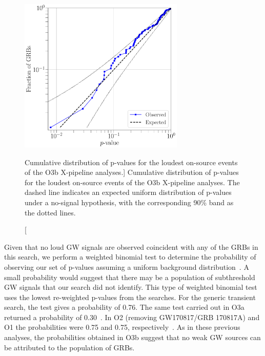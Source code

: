 \begin{figure}[h]
  \centering
  \includegraphics[width=0.7\textwidth]{figures/grb/o3b-x-pval.pdf}
  \caption
  [Cumulative distribution of p-values for the loudest on-source events of the O3b X-pipeline analyses.]
  {
    Cumulative distribution of p-values for the loudest on-source events of the O3b X-pipeline analyses.
    The dashed line indicates an expected uniform distribution of p-values under a no-signal hypothesis, with the corresponding 90\% band as the dotted lines.}
  \label{fig:grb-o3b-x-pval}
\end{figure}

Given that no loud \ac{GW} signals are observed coincident with any of the \acp{GRB} in this search, we perform a weighted binomial test to determine the probability of observing our set of p-values assuming a uniform background distribution~\citep{grb_s4, grb_s6}.
A small probability would suggest that there may be a population of subthreshold \ac{GW} signals that our search did not identify.
This type of weighted binomial test uses the lowest re-weighted p-values from the searches.
For the generic transient search, the test gives a probability of 0.76.
The same test carried out in O3a returned a probability of 0.30~\citep{grb_o3a}.
In O2 (removing GW170817/GRB 170817A) and O1 the probabilities were 0.75 and 0.75, respectively~\citep{grb_o2, grb_o1}.
As in these previous analyses, the probabilities obtained in O3b suggest that no weak GW sources can be attributed to the population of GRBs.

